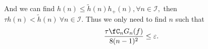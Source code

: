 %
%
%
%
%

And we can find  $h(n) \leq \tilde{h}(n) h_{+}(n), \forall n \in \mathcal{I},$ then $ \tau h(n)< \tilde{h}(n) \ \forall n \in \mathcal{I}.$
Thus we only need to find $n$ such that  \[
\frac{\tau \fC_n G_{n}(f)}{8(n-1)^2} \le \varepsilon.
\]

